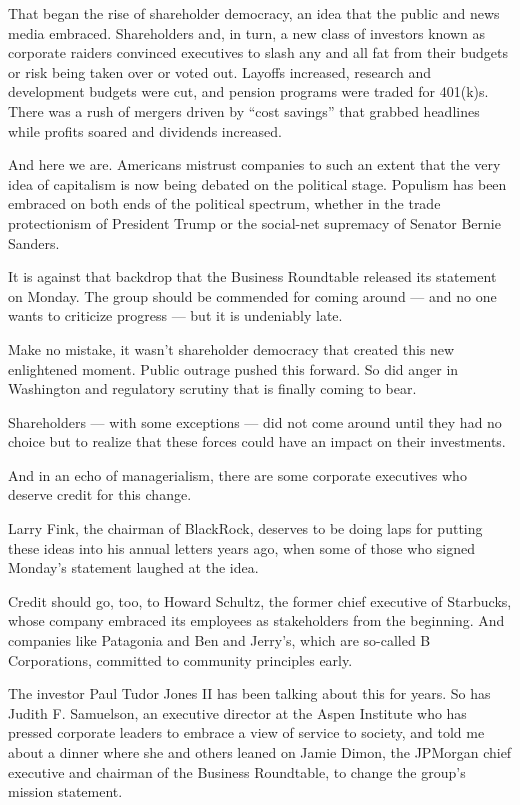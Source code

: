 That began the rise of shareholder democracy, an idea that the public
and news media embraced. Shareholders and, in turn, a new class of
investors known as corporate raiders convinced executives to slash any
and all fat from their budgets or risk being taken over or voted out.
Layoffs increased, research and development budgets were cut, and
pension programs were traded for 401(k)s. There was a rush of mergers
driven by ``cost savings'' that grabbed headlines while profits soared
and dividends increased.

And here we are. Americans mistrust companies to such an extent that the
very idea of capitalism is now being debated on the political stage.
Populism has been embraced on both ends of the political spectrum,
whether in the trade protectionism of President Trump or the social-net
supremacy of Senator Bernie Sanders.

It is against that backdrop that the Business Roundtable released its
statement on Monday. The group should be commended for coming around ---
and no one wants to criticize progress --- but it is undeniably late.

Make no mistake, it wasn't shareholder democracy that created this new
enlightened moment. Public outrage pushed this forward. So did anger in
Washington and regulatory scrutiny that is finally coming to bear.

Shareholders --- with some exceptions --- did not come around until they
had no choice but to realize that these forces could have an impact on
their investments.

And in an echo of managerialism, there are some corporate executives who
deserve credit for this change.

Larry Fink, the chairman of BlackRock, deserves to be doing laps for
putting these ideas into his annual letters years ago, when some of
those who signed Monday's statement laughed at the idea.

Credit should go, too, to Howard Schultz, the former chief executive of
Starbucks, whose company embraced its employees as stakeholders from the
beginning. And companies like Patagonia and Ben and Jerry's, which are
so-called B Corporations, committed to community principles early.

The investor Paul Tudor Jones II has been talking about this for years.
So has Judith F. Samuelson, an executive director at the Aspen Institute
who has pressed corporate leaders to embrace a view of service to
society, and told me about a dinner where she and others leaned on Jamie
Dimon, the JPMorgan chief executive and chairman of the Business
Roundtable, to change the group's mission statement.

